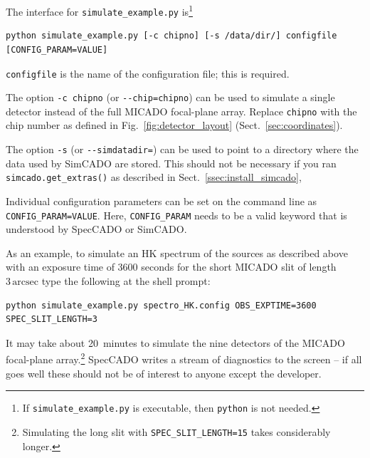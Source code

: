\documentclass[a4paper,twoside,11pt]{article}
\begin{document}
The interface for \lstinline{simulate_example.py} is\footnote{If
  \lstinline{simulate_example.py} is executable, then
  \lstinline{python} is not needed.}
\begin{lstlisting}[style=csh]
python simulate_example.py [-c chipno] [-s /data/dir/] configfile [CONFIG_PARAM=VALUE]
\end{lstlisting}
\lstinline{configfile} is the name of the configuration file; this is
required.

The option \lstinline{-c chipno} (or \lstinline{--chip=chipno}) can be
used to simulate a single detector instead of the full MICADO
focal-plane array. Replace \lstinline{chipno} with the chip number as
defined in Fig.~\ref{fig:detector_layout}
(Sect.~\ref{sec:coordinates}).

The option \lstinline{-s} (or \lstinline{--simdatadir=}) can be used
to point to a directory where the data used by SimCADO are
stored. This should not be necessary if you ran
\lstinline{simcado.get_extras()} as described in
Sect.~\ref{ssec:install_simcado},

Individual configuration parameters can be set on the command line as
\lstinline{CONFIG_PARAM=VALUE}. Here, \lstinline{CONFIG_PARAM} needs
to be a valid keyword that is understood by SpecCADO or SimCADO.


As an example, to simulate an HK spectrum of the sources as described
above with an exposure time of 3600 seconds for the short MICADO slit
of length $3\,\mathrm{arcsec}$ type the following at the shell
prompt:
\begin{lstlisting}[style=csh]
python simulate_example.py spectro_HK.config OBS_EXPTIME=3600 SPEC_SLIT_LENGTH=3
\end{lstlisting}
It may take about 20~minutes to simulate the nine detectors of the
MICADO focal-plane array.\footnote{Simulating the long slit with
  \lstinline{SPEC_SLIT_LENGTH=15} takes considerably longer.} SpecCADO
writes a stream of diagnostics to the screen -- if all goes well these
should not be of interest to anyone except the developer.
\end{document}
